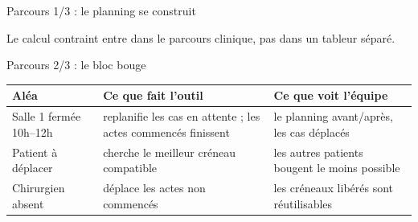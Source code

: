 \begin{frame}{Parcours 1/3 : le planning se construit}
  \small
  \centering

  \par\vspace{0.25cm}\footnotesize Le calcul contraint entre dans le
  parcours clinique, pas dans un tableur séparé.
\end{frame}

\begin{frame}{Parcours 2/3 : le bloc bouge}
  \small
  \renewcommand{\arraystretch}{1.45}
  \setlength{\tabcolsep}{4pt}
  \begin{tabular}{@{}p{3.3cm}p{5.1cm}p{4.9cm}@{}}
    \toprule
    \textbf{Aléa} & \textbf{Ce que fait l'outil} & \textbf{Ce que voit l'équipe} \\
    \midrule
    Salle 1 fermée 10h--12h & replanifie les cas en attente ; les actes
      commencés finissent & le planning avant/après, les cas déplacés \\
    Patient à déplacer & cherche le meilleur créneau compatible & les
      autres patients bougent le moins possible \\
    Chirurgien absent & déplace les actes non commencés & les créneaux
      libérés sont réutilisables \\
    \bottomrule
  \end{tabular}

\end{frame}


